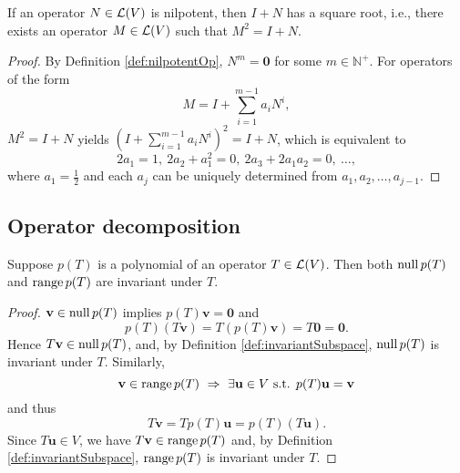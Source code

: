 \begin{lem}
  \label{lem:nilpotentOpPlusIdenHaveSquareRoots}
  If an operator $N\in{\cal L}(V)$ is nilpotent, 
  then $I+N$ has a square root,
  i.e., there exists an operator $M\in{\cal L}(V)$
  such that $M^2=I+N$.
\end{lem}
\begin{proof}
  By Definition \ref{def:nilpotentOp},
  $N^m=\mathbf{0}$ for some $m\in \mathbb{N}^+$. 
  For operators of the form
  \begin{displaymath}
    M = I + \sum_{i=1}^{m-1} a_i N^i,
  \end{displaymath}
  $M^2=I+N$ yields
  $\left(I + \sum_{i=1}^{m-1} a_i N^i\right)^2 = I +N$,
  which is equivalent to
  \begin{displaymath}
    2a_1 = 1,\ 2a_2+a_1^2=0, \ 2a_3+2a_1a_2=0,\ \ldots,
  \end{displaymath}
  where $a_1=\frac{1}{2}$ and each $a_j$
  can be uniquely determined from $a_1, a_2, \ldots, a_{j-1}$.
\end{proof}


\subsection{Operator decomposition}
\label{sec:oper-decomp}

\begin{lem}
  \label{lem:NullRangeInvariantUnderPolyT}
  Suppose $p(T)$ is a polynomial of an operator $T\in {\cal L}(V)$.
  Then both $\mathrm{null}\,p(T)$ and $\mathrm{range}\,p(T)$
  are invariant under $T$.
\end{lem}
\begin{proof}
  $\mathbf{v}\in \mathrm{null}\,p(T)$ implies $p(T)\mathbf{v}=\mathbf{0}$
  and 
  \begin{displaymath}
    p(T) (T\mathbf{v}) = T (p(T)\mathbf{v}) = T \mathbf{0}= \mathbf{0}.
  \end{displaymath}
  Hence $T\mathbf{v}\in \mathrm{null}\, p(T)$,
  and, by Definition \ref{def:invariantSubspace},
  $\mathrm{null}\,p(T)$ is invariant under $T$.
  Similarly,
  \begin{displaymath}
    \mathbf{v}\in \Range\,p(T)\ \Rightarrow\
    \exists \mathbf{u}\in V \text{ s.t. }
    p(T)\mathbf{u}=\mathbf{v}
  \end{displaymath}
  and thus
  \begin{displaymath}
    T\mathbf{v} = T p(T)\mathbf{u} =
    p(T)(T\mathbf{u}).
  \end{displaymath}
  Since $T\mathbf{u}\in V$,
  we have $T\mathbf{v}\in\mathrm{range}\,p(T)$
  and, by Definition \ref{def:invariantSubspace},
  $\mathrm{range}\,p(T)$ is invariant under $T$.
\end{proof}

